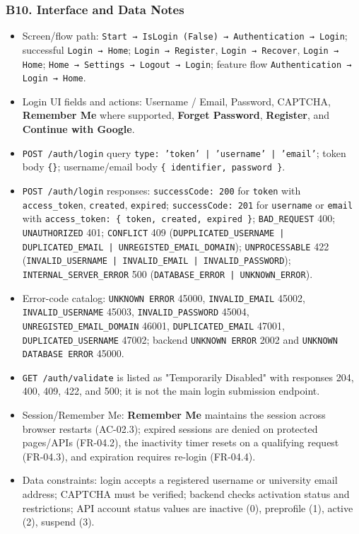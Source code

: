\documentclass[12pt]{article}
\begin{document}
\hypertarget{sec:b10-interface-and-data-notes}{}
\subsubsection*{B10. Interface and Data Notes}
\par\medskip

\begin{itemize}
\item Screen/flow path: \texttt{Start → IsLogin (False) → Authentication → Login}; successful \texttt{Login → Home}; \texttt{Login → Register}, \texttt{Login → Recover}, \texttt{Login → Home}; \texttt{Home → Settings → Logout → Login}; feature flow \texttt{Authentication → Login → Home}.
\item Login UI fields and actions: Username / Email, Password, CAPTCHA, \textbf{Remember Me} where supported, \textbf{Forget Password}, \textbf{Register}, and \textbf{Continue with Google}.
\item \texttt{POST /auth/login} query \texttt{type: 'token' | 'username' | 'email'}; token body \texttt{\{\}}; username/email body \texttt{\{ identifier, password \}}.
\item \texttt{POST /auth/login} responses: \texttt{successCode: 200} for \texttt{token} with \texttt{access\_token}, \texttt{created}, \texttt{expired}; \texttt{successCode: 201} for \texttt{username} or \texttt{email} with \texttt{access\_token: \{ token, created, expired \}}; \texttt{BAD\_REQUEST} 400; \texttt{UNAUTHORIZED} 401; \texttt{CONFLICT} 409 (\texttt{DUPPLICATED\_USERNAME | DUPLICATED\_EMAIL | UNREGISTED\_EMAIL\_DOMAIN}); \texttt{UNPROCESSABLE} 422 (\texttt{INVALID\_USERNAME | INVALID\_EMAIL | INVALID\_PASSWORD}); \texttt{INTERNAL\_SERVER\_ERROR} 500 (\texttt{DATABASE\_ERROR | UNKNOWN\_ERROR}).
\item Error-code catalog: \texttt{UNKNOWN ERROR} 45000, \texttt{INVALID\_EMAIL} 45002, \texttt{INVALID\_USERNAME} 45003, \texttt{INVALID\_PASSWORD} 45004, \texttt{UNREGISTED\_EMAIL\_DOMAIN} 46001, \texttt{DUPLICATED\_EMAIL} 47001, \texttt{DUPLICATED\_USERNAME} 47002; backend \texttt{UNKNOWN ERROR} 2002 and \texttt{UNKNOWN DATABASE ERROR} 45000.
\item \texttt{GET /auth/validate} is listed as "Temporarily Disabled" with responses 204, 400, 409, 422, and 500; it is not the main login submission endpoint.
\item Session/Remember Me: \textbf{Remember Me} maintains the session across browser restarts (AC-02.3); expired sessions are denied on protected pages/APIs (FR-04.2), the inactivity timer resets on a qualifying request (FR-04.3), and expiration requires re-login (FR-04.4).
\item Data constraints: login accepts a registered username or university email address; CAPTCHA must be verified; backend checks activation status and restrictions; API account status values are inactive (0), preprofile (1), active (2), suspend (3).
\end{itemize}
\par\medskip
\end{document}

